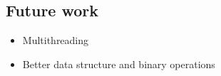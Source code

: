 \documentclass[a4paper]{article}
\begin{document}
\subsection{Future work}
\begin{itemize}
    \item Multithreading
    \item Better data structure and binary operations
\end{itemize}





%
%
\newpage


\end{document}
